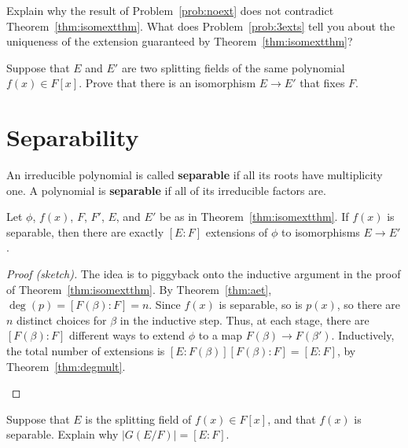 \begin{problem}
    Explain why the result of Problem~\ref{prob:noext} does not contradict Theorem~\ref{thm:isomextthm}. What does Problem~\ref{prob:3exts} tell you about the uniqueness of the extension guaranteed by Theorem~\ref{thm:isomextthm}?
\end{problem}

\begin{problem}
    Suppose that $E$ and $E'$ are two splitting fields of the same polynomial $f(x)\in F[x]$. Prove that there is an isomorphism $E \longrightarrow E'$ that fixes $F$.
\end{problem}

\section{Separability}

\begin{definition}
An irreducible polynomial is called \textbf{separable} if all its roots have multiplicity one. A polynomial is \textbf{separable} if all of its irreducible factors are.
\end{definition}
\begin{theorem}
    Let $\phi$, $f(x)$, $F$, $F'$, $E$, and $E'$ be as in Theorem~\ref{thm:isomextthm}. If $f(x)$ is separable, then there are exactly $[E:F]$ extensions of $\phi$ to isomorphisms $E \longrightarrow E'$.
    \label{thm:numexts}
\end{theorem}
\begin{proof}[Proof (sketch)] The idea is to piggyback onto the inductive argument in the proof of Theorem~\ref{thm:isomextthm}. By Theorem~\ref{thm:aet}, $\deg(p) = [F(\beta):F] = n$. Since $f(x)$ is separable, so is $p(x)$, so there are $n$ distinct choices for $\beta$ in the inductive step. Thus, at each stage, there are $[F(\beta):F]$ different ways to extend $\phi$ to a map $F(\beta) \longrightarrow F(\beta')$. Inductively, the total number of extensions is $[E:F(\beta)][F(\beta):F] = [E:F]$, by Theorem~\ref{thm:degmult}.
\begin{annotation}
\end{annotation}
\end{proof}

\begin{problem}\label{prob:sizegg}
Suppose that $E$ is the splitting field of $f(x) \in F[x]$, and that $f(x)$ is separable.  Explain why $\lvert G(E/F) \rvert = [E:F]$.
\end{problem}

